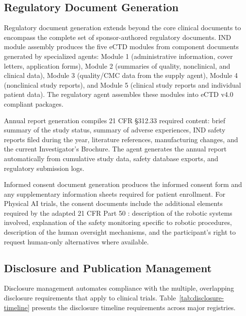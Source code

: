 \subsection{Regulatory Document Generation}

Regulatory document generation extends beyond the core clinical documents to encompass
the complete set of sponsor-authored regulatory documents. IND module assembly produces
the five eCTD modules from component documents generated by specialized agents: Module 1
(administrative information, cover letters, application forms), Module 2 (summaries of
quality, nonclinical, and clinical data), Module 3 (quality/CMC data from the supply
agent), Module 4 (nonclinical study reports), and Module 5 (clinical study reports and
individual patient data). The regulatory agent assembles these modules into eCTD v4.0
\cite{fda-ectd} compliant packages.

Annual report generation compiles 21 CFR \S312.33 required content: brief summary of
the study status, summary of adverse experiences, IND safety reports filed during the
year, literature references, manufacturing changes, and the current Investigator's
Brochure. The agent generates the annual report automatically from cumulative study data,
safety database exports, and regulatory submission logs.

Informed consent document generation produces the informed consent form and any supplementary
information sheets required for patient enrollment. For Physical AI trials, the consent
documents include the additional elements required by the adapted 21 CFR Part 50
\cite{cfr50-adapt}: description of the robotic systems involved, explanation of the safety
monitoring specific to robotic procedures, description of the human oversight
mechanisms, and the participant's right to request human-only alternatives where available.

\subsection{Disclosure and Publication Management}

Disclosure management automates compliance with the multiple, overlapping disclosure
requirements that apply to clinical trials. Table~\ref{tab:disclosure-timeline} presents
the disclosure timeline requirements across major registries.


